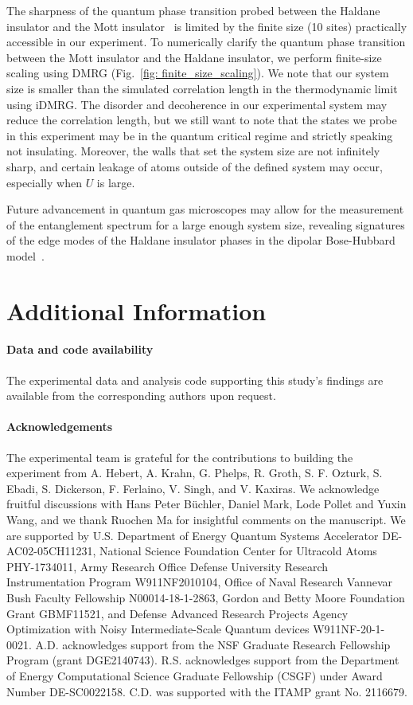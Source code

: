 \documentclass[preprint,superscriptaddress,floatfix, nofootinbib]{revtex4-2}
\begin{document}
The sharpness of the quantum phase transition probed between the Haldane insulator and the Mott insulator~\cite{Fraxanet2022} is limited by the finite size (10 sites) practically accessible in our experiment. To numerically clarify the quantum phase transition between the Mott insulator and the Haldane insulator, we perform finite-size scaling using DMRG (Fig.~\ref{fig: finite_size_scaling}). We note that our system size is smaller than the simulated correlation length in the thermodynamic limit using iDMRG. The disorder and decoherence in our experimental system may reduce the correlation length, but we still want to note that the states we probe in this experiment may be in the quantum critical regime and strictly speaking not insulating. Moreover, the walls that set the system size are not infinitely sharp, and certain leakage of atoms outside of the defined system may occur, especially when $U$ is large.

Future advancement in quantum gas microscopes may allow for the measurement of the entanglement spectrum for a large enough system size, revealing signatures of the edge modes of the Haldane insulator phases in the dipolar Bose-Hubbard model~\cite{Deng2011, Tran2023}.


\section*{Additional Information}

\paragraph*{Data and code availability}
The experimental data and analysis code supporting this study's findings are available from the corresponding authors upon request.

\paragraph*{Acknowledgements}
The experimental team is grateful for the contributions to building the experiment from A. Hebert, A. Krahn, G. Phelps, R. Groth, S. F. Ozturk, S. Ebadi, S. Dickerson, F. Ferlaino, V. Singh, and V. Kaxiras. We acknowledge fruitful discussions with Hans Peter B\"uchler, Daniel Mark, Lode Pollet and Yuxin Wang, and we thank Ruochen Ma for insightful comments on the manuscript. 
%
We are supported by U.S. Department of Energy Quantum Systems Accelerator DE-AC02-05CH11231, National Science Foundation Center for Ultracold Atoms PHY-1734011, Army Research Office Defense University Research Instrumentation Program W911NF2010104, Office of Naval Research Vannevar Bush Faculty Fellowship N00014-18-1-2863, Gordon and Betty Moore Foundation Grant GBMF11521, and Defense Advanced Research Projects Agency Optimization with Noisy Intermediate-Scale Quantum devices W911NF-20-1-0021. A.D. acknowledges support from the NSF Graduate Research Fellowship Program (grant DGE2140743). R.S. acknowledges support from the Department of Energy Computational Science Graduate Fellowship (CSGF) under Award Number DE-SC0022158. C.D. was supported with the ITAMP grant No. 2116679.
\end{document}

